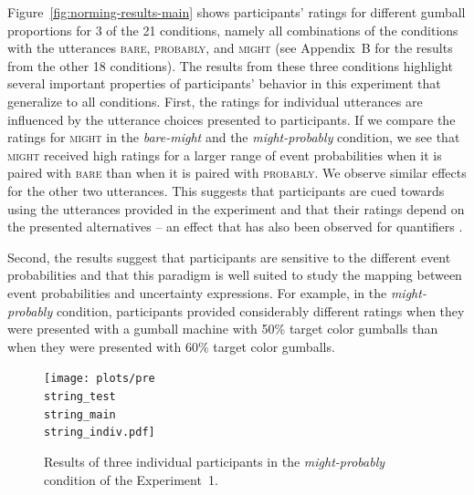 \documentclass[man, floatsintext]{apa6}
\begin{document}
Figure~\ref{fig:norming-results-main} shows participants' ratings for different gumball proportions for 3 of the 21 conditions, namely all combinations of the conditions
with the utterances \textsc{bare}, \textsc{probably}, and \textsc{might} (see Appendix~B for the results from the other 18 conditions). 
The results from these three conditions highlight several important properties of participants'
behavior in this experiment that generalize to all conditions.
First, the ratings for individual utterances are influenced by the utterance choices presented to participants.
If we compare the ratings for \textsc{might} in the \textit{bare-might} and the \textit{might-probably} condition, we see that \textsc{might} received high ratings for a larger
range of event probabilities when it is paired with \textsc{bare} than when it is paired with \textsc{probably}. We observe similar effects for the other two utterances.
This suggests that participants are cued towards using the utterances provided in the experiment and that their ratings depend on the presented alternatives -- an effect that
has also been observed for quantifiers \parencite{Degen2016}.

Second, the results suggest that participants are sensitive to the different event probabilities and that this paradigm is well suited to study 
the mapping between event probabilities and uncertainty expressions. For example, in the \textit{might-probably} condition, participants
provided considerably different ratings when they were presented with a gumball machine with 50\% target color gumballs than when they
were presented with 60\% target color gumballs.

\begin{figure}
\texttt{[image: plots/pre\\string\_test\\string\_main\\string\_indiv.pdf]}
\caption{Results of three individual participants in the \emph{might-probably} condition of the Experiment~1. \label{fig:norming-results-indiv}}
\end{figure}
\end{document}
